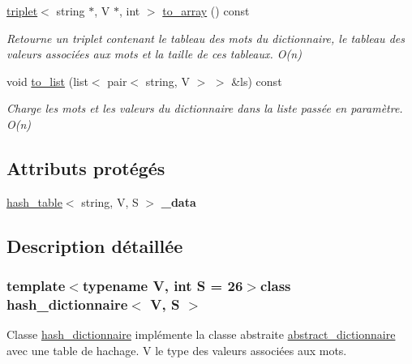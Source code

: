 \begin{DoxyCompactItemize}
\hyperlink{structtriplet}{triplet}$<$ string $\ast$, V $\ast$, int $>$ \hyperlink{classhash__dictionnaire_a4ea9ee40aa51412199f64a6dce55842d}{to\-\_\-array} () const 
\begin{DoxyCompactList}\small\item\em Retourne un triplet contenant le tableau des mots du dictionnaire, le tableau des valeurs associées aux mots et la taille de ces tableaux. O(n) \end{DoxyCompactList}\item 
void \hyperlink{classhash__dictionnaire_ac307646722314ba8898c544f485eae8a}{to\-\_\-list} (list$<$ pair$<$ string, V $>$ $>$ \&ls) const 
\begin{DoxyCompactList}\small\item\em Charge les mots et les valeurs du dictionnaire dans la liste passée en paramètre. O(n) \end{DoxyCompactList}\end{DoxyCompactItemize}
\subsection*{Attributs protégés}
\begin{DoxyCompactItemize}
\item 
\hypertarget{classhash__dictionnaire_a32ee1b9b8aa689c4ae7d54af4d8c3140}{\hyperlink{classhash__table}{hash\-\_\-table}$<$ string, V, S $>$ {\bfseries \-\_\-data}}\label{classhash__dictionnaire_a32ee1b9b8aa689c4ae7d54af4d8c3140}

\end{DoxyCompactItemize}


\subsection{Description détaillée}
\subsubsection*{template$<$typename V, int S = 26$>$class hash\-\_\-dictionnaire$<$ V, S $>$}

Classe \hyperlink{classhash__dictionnaire}{hash\-\_\-dictionnaire} implémente la classe abstraite \hyperlink{classabstract__dictionnaire}{abstract\-\_\-dictionnaire} avec une table de hachage. V le type des valeurs associées aux mots. 

